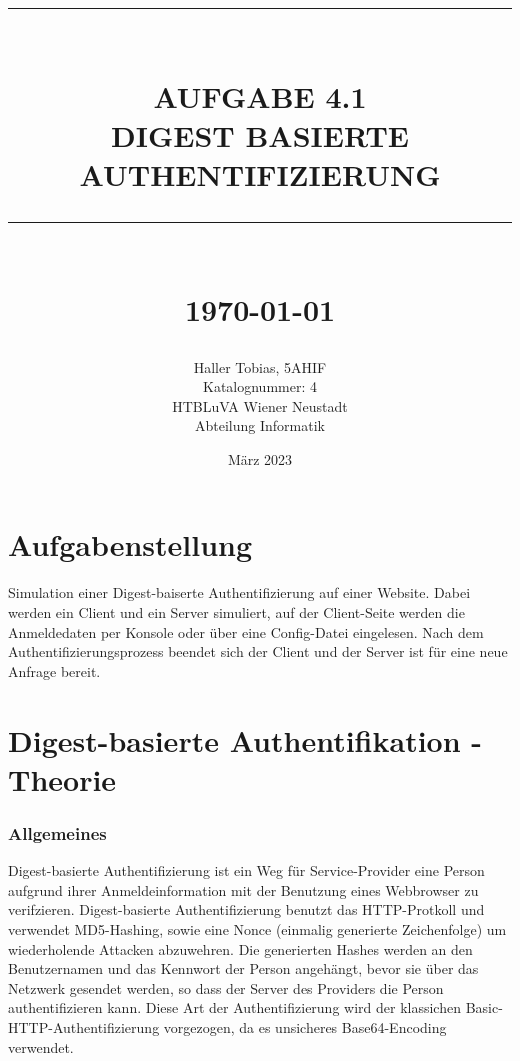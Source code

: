 \documentclass[12pt]{report}
\newcommand{\HRule}[1]{\rule{\linewidth}{#1}}
\begin{document}
\title{ \normalsize
		\\ [2.0cm]
		\HRule{0.5pt} \\
		\LARGE \textbf{\uppercase{Aufgabe 4.1 \\ Digest basierte Authentifizierung}}
		\HRule{2pt} \\ [0.5cm]
		\normalsize \today \vspace*{5\baselineskip}}

\date{März 2023}

\author{
        Haller Tobias, 5AHIF \\
		Katalognummer: 4 \\ 
		HTBLuVA Wiener Neustadt \\
        Abteilung Informatik }

\maketitle
\tableofcontents
\newpage

\sectionfont{\scshape}


\chapter{Aufgabenstellung}
Simulation einer Digest-baiserte Authentifizierung auf einer Website. Dabei werden ein Client und ein Server simuliert, auf der Client-Seite werden die Anmeldedaten per Konsole oder über eine Config-Datei eingelesen. Nach dem Authentifizierungsprozess beendet sich der Client und der Server ist für eine neue Anfrage bereit.

\chapter{Digest-basierte Authentifikation - Theorie}
\subsection{Allgemeines}
Digest-basierte Authentifizierung ist ein Weg für Service-Provider eine Person aufgrund ihrer Anmeldeinformation mit der Benutzung eines Webbrowser zu verifzieren. Digest-basierte Authentifizierung benutzt das HTTP-Protkoll und verwendet MD5-Hashing, sowie eine Nonce (einmalig generierte Zeichenfolge) um wiederholende Attacken abzuwehren. Die generierten Hashes werden an den Benutzernamen und das Kennwort der Person angehängt, bevor sie über das Netzwerk gesendet werden, so dass der Server des Providers die Person authentifizieren kann. Diese Art der Authentifizierung wird der klassichen Basic-HTTP-Authentifizierung vorgezogen, da es unsicheres Base64-Encoding verwendet. 
\end{document}
